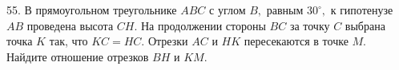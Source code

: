 55.  В прямоугольном треугольнике $ABC$ с углом $B,$ равным $30^\circ,$ к гипотенузе $AB$ проведена высота $CH.$ На продолжении стороны $BC$ за точку $C$ выбрана точка $K$ так, что $KC=HC.$ Отрезки $AC$ и $HK$ пересекаются в точке $M.$ Найдите отношение отрезков $BH$ и $KM.$\\
